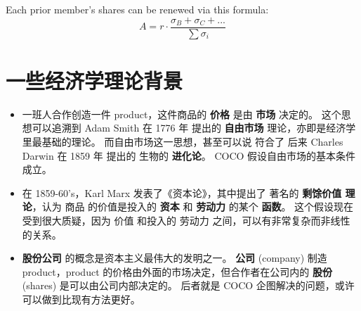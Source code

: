 \documentclass[12pt, orivec, fleqn]{article}
\newcommand{\cc}[2]{#1}
\newcommand{\cc}[2]{#2}
\begin{document}
Each prior member's shares can be renewed via this formula:
\begin{equation}
A = r \cdot \frac{\sigma_B + \sigma_C + ...}{\sum \sigma_i}
\end{equation}

\secttoc
\section{\cc{一些经济学理论背景}{Some economic-theoretical background}}

\begin{itemize}

\item \cc{
	一班人合作创造一件 product，这件商品的 \textbf{价格} 是由 \textbf{市场} 决定的。  这个思想可以追溯到 Adam Smith 在 1776 年 提出的 \textbf{自由市场} 理论，亦即是经济学里最基础的理论。 而自由市场这一思想，甚至可以说 符合了 后来 Charles Darwin 在 1859 年 提出的 生物的 \textbf{进化论}。  COCO 假设自由市场的基本条件成立。
}{
	When a group of people creates a \textbf{product}, its \textbf{price} is determined by the \textbf{market}.  This idea, first articulated by Adam Smith in 1776, is one of the foundational principles of all economics.  It can be said that free-market competition is also congruent with the idea of biological \textbf{evolution}, posited by Charles Darwin, later in 1859.  We assume here that the conditions of free-market economics are satisfied.
}

\item \cc{
	在 1859-60's，Karl Marx 发表了《资本论》，其中提出了 著名的 \textbf{剩馀价值 理论}，认为 商品 的价值是投入的 \textbf{资本} 和 \textbf{劳动力} 的某个 \textbf{函数}。  这个假设现在受到很大质疑，因为 价值 和投入的 劳动力 之间，可以有非常复杂而非线性的关系。 
}{
	Around 1859-60's, Karl Marx published \textit{Das Kapital}, in which he posited the now-famous theory of \textbf{surplus values}.  According to this view, the value of a commodity is construed as a function of the input of \textbf{capital} and \textbf{labor}.  Currently, this assumption is thrown into great doubt because the value of a product may depend on input labor in highly complex and non-linear relations.
}

\item \cc{
	\textbf{股份公司} 的概念是资本主义最伟大的发明之一。  \textbf{公司} (company) 制造 product，product 的价格由外面的市场决定，但合作者在公司内的 \textbf{股份} (shares) 是可以由公司内部决定的。  后者就是 COCO 企图解决的问题，或许可以做到比现有方法更好。
}{
	Economists would agree that the notion of \textbf{joint-stock companies} is one of the greatest inventions of capitalism.  While prices are determined externally by markets, the shares of a company that a participant owns can be decided internally by the company.  The goal of COCO is to provide a (hopefully) better method of distributing shares for online companies.
}
\end{itemize}


\printbibliography
\end{document}
